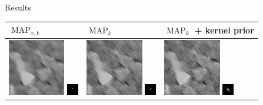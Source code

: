\documentclass{beamer}
\DeclareMathOperator{\MAP}{MAP}
\begin{document}
\begin{frame}{Results}
\centering
{}
\raisebox{-0.5\height}{$\;* $ }
\raisebox{-0.5\height}{$\;= $}
\\
\begin{tabular}{|l|l|l|}
	\hline
	$\MAP_{x,k}$ & $\MAP_{k}$ & $\MAP_{k}$ + kernel prior\\
	\hline
\includegraphics[width=2.5cm]{results/candy_kernel3_MAPxk_x.png}
\includegraphics[width=0.5cm]{results/candy_kernel3_MAPxk_k.png}
&
\includegraphics[width=2.5cm]{results/candy_kernel3_MAPk_x.png}
\includegraphics[width=0.5cm]{results/candy_kernel3_MAPk_k.png}
&
\includegraphics[width=2.5cm]{results/candy_kernel3_MAPkreg_x.png}
\includegraphics[width=0.5cm]{results/candy_kernel3_MAPkreg_k.png}
\\
\hline
\end{tabular}

\end{frame}
	
\end{document}

